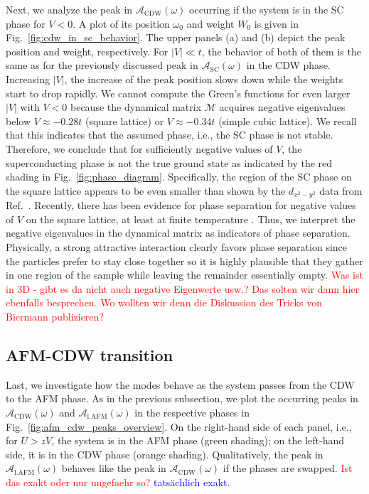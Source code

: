 \documentclass[
    reprint, 
    aps,
    preprintnumbers,
    twocolumn,
    prb,
    superscriptaddress
]{revtex4-2}
\newcommand{\mM}{\mathcal{M}}
\newcommand{\spectral}[1]{\mathcal{A}_\text{#1}  (\omega)}
\newcommand{\red}[1]{\textcolor{red}{#1}}
\newcommand{\blue}[1]{\textcolor{blue}{#1}}
\begin{document}
Next, we analyze the peak in $\spectral{CDW}$ occurring if the system is in the SC phase for $V<0$.
A plot of its position $\omega_0$ and weight $W_0$ is given in Fig.\ \ref{fig:cdw_in_sc_behavior}.
The upper panels (a) and (b) depict the peak position and weight, respectively.
For $|V| \ll t$, the behavior of both of them is the same as for the 
previously discussed peak in $\spectral{SC}$ in the CDW phase.
Increasing $|V|$, the increase of the peak position slows down while the weights start to drop rapidly.
We cannot compute the Green's functions for even larger $|V|$ with $V<0$ because the dynamical matrix $\mM$ 
acquires negative eigenvalues below $V\approx -0.28t$ (square lattice) or $V\approx -0.34t$ (simple cubic lattice). 
We recall that this indicates that the assumed phase, i.e., the SC phase is not stable. 
Therefore, we conclude that for sufficiently negative values of $V$, 
the superconducting phase is not the true ground state as indicated by the red shading in Fig.\ \ref{fig:phase_diagram}.
Specifically, the region of the SC phase on the square lattice 
appears to be even smaller than shown by the $d_{x^2 -y^2}$ data from Ref.\ \cite{Micnas88b}.
Recently, there has been evidence for phase separation for negative values of $V$ 
on the square lattice, at least at finite temperature \cite{Linner23}. 
Thus, we interpret the negative eigenvalues in the dynamical matrix as indicators of phase separation. 
Physically, a strong attractive interaction clearly favors phase separation since the particles prefer to stay close together 
so it is highly plausible that they gather in one region of the sample while leaving the remainder essentially empty.
\red{Was ist in 3D - gibt es da nicht auch negative Eigenwerte usw.? Das solten wir dann hier
ebenfalls besprechen. Wo wollten wir denn die Diskussion des Tricks von Biermann publizieren?}



\subsection{AFM-CDW transition}

Last, we investigate how the modes behave as the system passes from the CDW to the AFM phase.
As in the previous subsection, we plot the occurring peaks in $\spectral{CDW}$ and 
$\spectral{l.AFM}$ in the respective phases in Fig.\ \ref{fig:afm_cdw_peaks_overview}.
On the right-hand side of each panel, i.e., for $U > zV$, the system is in the AFM phase (green shading);
on the left-hand side, it is in the CDW phase (orange shading).
Qualitatively, the peak in $\spectral{l.AFM}$ behaves like the peak in 
$\spectral{CDW}$ if the phases are swapped. \red{Ist das exakt oder nur ungefaehr so?} \blue{tatsächlich exakt.}
\end{document}
